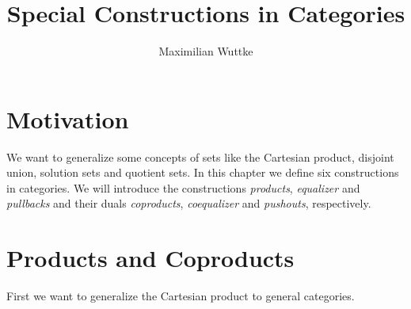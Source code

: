 \def\pathToRoot{../../}

\usepackage{todonotes}

\newcommand{\catA}[0]{\cat{A}}
\newcommand{\catB}[0]{\cat{B}}
\newcommand{\fbar}[0]{\bar{f}}
\newcommand{\ftilde}[0]{\tilde{f}}
\newcommand{\gbar}[0]{\bar{g}}
\newcommand{\gtilde}[0]{\tilde{g}}
\newcommand{\dunion}[0]{\sqcup}
\newcommand{\bigdunion}[0]{\bigsqcup}
\renewcommand{\demph}[1]{\emph{#1}} %

\newcommand{\setCon}[1]{\bigl \{ #1 \bigr \}}
\newcommand{\setMap}[2]{\setCon{#1 \,\big|\, #2}}
\newcommand{\pair}[2]{\left( #1 , #2 \right)}
\newcommand{\class}[1]{\left[ #1 \right]}
\newcommand{\choice}[1]{\left< #1 \right>}

\newtheorem{definition}{Definition}
\newtheorem{example}{Example}
\newtheorem{lemma}{Lemma}

\title{Special Constructions in Categories}
\author{Maximilian Wuttke}



\maketitle

\section*{Motivation}
We want to generalize some concepts of sets like the Cartesian product, disjoint union, solution sets and quotient sets.
In this chapter we define six constructions in categories.
We will introduce the constructions \emph{products}, \emph{equalizer} and \emph{pullbacks} and their duals
\emph{coproducts}, \emph{coequalizer} and \emph{pushouts}, respectively.

\section*{Products and Coproducts}

First we want to generalize the Cartesian product to general categories.

